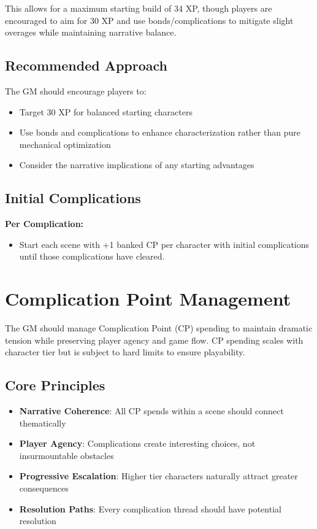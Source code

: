 \documentclass[11pt]{article}
\begin{document}
This allows for a maximum starting build of 34 XP, though players are encouraged to aim for 30 XP and use bonds/complications to mitigate slight overages while maintaining narrative balance.

\subsection{Recommended Approach}
The GM should encourage players to:
\begin{itemize}
    \item Target 30 XP for balanced starting characters
    \item Use bonds and complications to enhance characterization rather than pure mechanical optimization
    \item Consider the narrative implications of any starting advantages
\end{itemize}

\subsection*{Initial Complications}
\textbf{Per Complication:}
\begin{itemize}
    \item Start each scene  with +1 banked CP per character with  initial complications until those complications have cleared.
\end{itemize}

\section{Complication Point Management}

The GM should manage Complication Point (CP) spending to maintain dramatic tension while preserving player agency and game flow. CP spending scales with character tier but is subject to hard limits to ensure playability.

\subsection{Core Principles}
\begin{itemize}
    \item \textbf{Narrative Coherence}: All CP spends within a scene should connect thematically
    \item \textbf{Player Agency}: Complications create interesting choices, not insurmountable obstacles
    \item \textbf{Progressive Escalation}: Higher tier characters naturally attract greater consequences
    \item \textbf{Resolution Paths}: Every complication thread should have potential resolution
\end{itemize}
\end{document}
